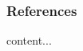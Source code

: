 \documentclass{beamer}
\begin{document}
\begin{frame}[allowframebreaks,label=both]   
\nocite{*} 
\frametitle{References}

        
    

\end{frame}

\begin{frame}[label=long]
content...
\end{frame}
\end{document}
